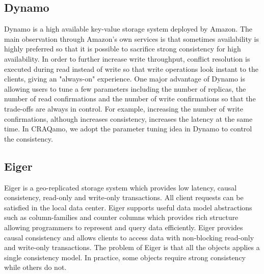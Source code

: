 \subsection{Dynamo}
Dynamo\cite{decandia2007dynamo} is a high available key-value storage system deployed by Amazon. The main observation through Amazon's own services is that sometimes availability is highly preferred so that it is possible to sacrifice strong consistency for high availability. In order to further increase write throughput, conflict resolution is executed during read instead of write so that write operations look instant to the clients, giving an "always-on" experience. One major advantage of Dynamo is allowing users to tune a few parameters including the number of replicas, the number of read confirmations and the number of write confirmations so that the trade-offs are always in control. For example, increasing the number of write confirmations, although increases consistency, increases the latency at the same time. In CRAQamo, we adopt the parameter tuning idea in Dynamo to control the consistency. 

\subsection{Eiger}
Eiger\cite{lloyd2013stronger} is a geo-replicated storage system which provides low latency, causal consistency, read-only and write-only transactions. All client requests can be satisfied in the local data center. Eiger supports useful data model abstractions such as column-families and counter columns which provides rich structure allowing programmers to represent and query data efficiently. Eiger provides causal consistency and allows clients to access data with non-blocking read-only and write-only transactions. The problem of Eiger is that all the objects applies a single consistency model. In practice, some objects require strong consistency while others do not. 
\label{sec:related}

